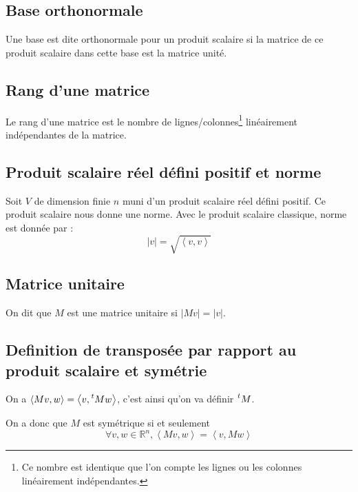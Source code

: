 \documentclass[a4paper,10pt]{article}
\newcommand{\grp}[1]{\left\langle #1 \right\rangle} %
\newcommand{\RR}{\mathbb{R}} %
\newcommand{\transposee}[1]{{\vphantom{#1}}^{\mathit t}{#1}} %
\begin{document}
  \subsection{Base orthonormale}
   Une base est dite orthonormale pour un produit scalaire si la matrice de ce produit scalaire dans cette base est la matrice unité.

  \subsection{Rang d'une matrice}
   Le rang d'une matrice est le nombre de lignes/colonnes\footnote{Ce nombre est identique que l'on compte les lignes ou les colonnes linéairement indépendantes.} linéairement indépendantes de la matrice.

  \subsection{Produit scalaire réel défini positif et norme}
   Soit $V$ de dimension finie $n$ muni d'un produit scalaire réel défini positif. Ce produit scalaire nous donne une norme. Avec le produit scalaire classique, norme est donnée par : 
    $$|v|=\sqrt{\grp{v,v}}$$

  \subsection{Matrice unitaire}
   On dit que $M$ est une matrice unitaire si $|Mv|=|v|$.

  \subsection{Definition de transposée par rapport au produit scalaire et symétrie}
   On a $\grp{Mv,w}=\grp{v,\transposee{M}w}$, c'est ainsi qu'on va définir $\transposee{M}$.

   On a donc que $M$ est symétrique si et seulement $$\forall v,w\in \RR^n, \grp{Mv,w}=\grp{v,Mw}$$

 \begin{comment}
  \subsection{Hessienne}
   voir cours 14/05/08 p3
 \end{comment}
\end{document}
